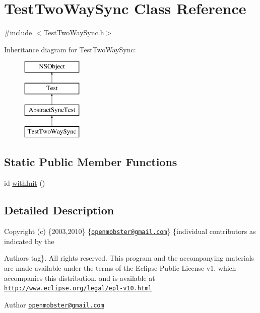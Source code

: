 \hypertarget{interface_test_two_way_sync}{
\section{\-Test\-Two\-Way\-Sync \-Class \-Reference}
\label{interface_test_two_way_sync}
}


{\ttfamily \#include $<$\-Test\-Two\-Way\-Sync.\-h$>$}

\-Inheritance diagram for \-Test\-Two\-Way\-Sync\-:\begin{figure}[H]
\begin{center}
\leavevmode
\includegraphics[height=4.000000cm]{interface_test_two_way_sync}
\end{center}
\end{figure}
\subsection*{\-Static \-Public \-Member \-Functions}
\begin{DoxyCompactItemize}
\item 
id \hyperlink{interface_test_two_way_sync_a8ff5e2a2d71a53deafef537f0c044141}{with\-Init} ()
\end{DoxyCompactItemize}


\subsection{\-Detailed \-Description}
\-Copyright (c) \{2003,2010\} \{\href{mailto:openmobster@gmail.com}{\tt openmobster@gmail.\-com}\} \{individual contributors as indicated by the \begin{DoxyAuthor}{\-Authors}
tag\}. \-All rights reserved. \-This program and the accompanying materials are made available under the terms of the \-Eclipse \-Public \-License v1. which accompanies this distribution, and is available at \href{http://www.eclipse.org/legal/epl-v10.html}{\tt http\-://www.\-eclipse.\-org/legal/epl-\/v10.\-html}
\end{DoxyAuthor}
\begin{DoxyAuthor}{\-Author}
\href{mailto:openmobster@gmail.com}{\tt openmobster@gmail.\-com} 
\end{DoxyAuthor}


